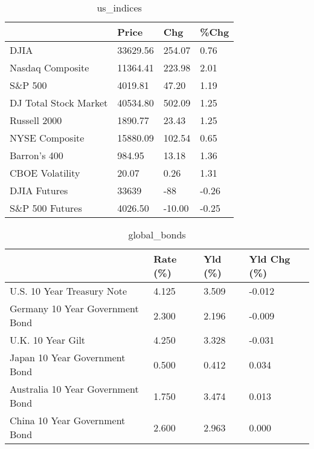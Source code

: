 \documentclass{article}%
\begin{document}
%


\begin{table}[htbp]%
\caption{us\_indices}%
\centering%
\begin{adjustbox}{width=1\textwidth}%
\begin{tabular}{llll}
\toprule
                      &    Price &    Chg &  \%Chg \\
\midrule
                 DJIA & 33629.56 & 254.07 &  0.76 \\
     Nasdaq Composite & 11364.41 & 223.98 &  2.01 \\
              S\&P 500 &  4019.81 &  47.20 &  1.19 \\
DJ Total Stock Market & 40534.80 & 502.09 &  1.25 \\
         Russell 2000 &  1890.77 &  23.43 &  1.25 \\
       NYSE Composite & 15880.09 & 102.54 &  0.65 \\
         Barron's 400 &   984.95 &  13.18 &  1.36 \\
      CBOE Volatility &    20.07 &   0.26 &  1.31 \\
         DJIA Futures &    33639 &    -88 & -0.26 \\
      S\&P 500 Futures &  4026.50 & -10.00 & -0.25 \\
\bottomrule
\end{tabular}
%
\end{adjustbox}%
\end{table}

%


\begin{table}[htbp]%
\caption{global\_bonds}%
\centering%
\begin{adjustbox}{width=1\textwidth}%
\begin{tabular}{llll}
\toprule
                                  & Rate (\%) & Yld (\%) & Yld Chg (\%) \\
\midrule
       U.S. 10 Year Treasury Note &    4.125 &   3.509 &      -0.012 \\
  Germany 10 Year Government Bond &    2.300 &   2.196 &      -0.009 \\
                U.K. 10 Year Gilt &    4.250 &   3.328 &      -0.031 \\
    Japan 10 Year Government Bond &    0.500 &   0.412 &       0.034 \\
Australia 10 Year Government Bond &    1.750 &   3.474 &       0.013 \\
    China 10 Year Government Bond &    2.600 &   2.963 &       0.000 \\
\bottomrule
\end{tabular}
%
\end{adjustbox}%
\end{table}
\end{document}
